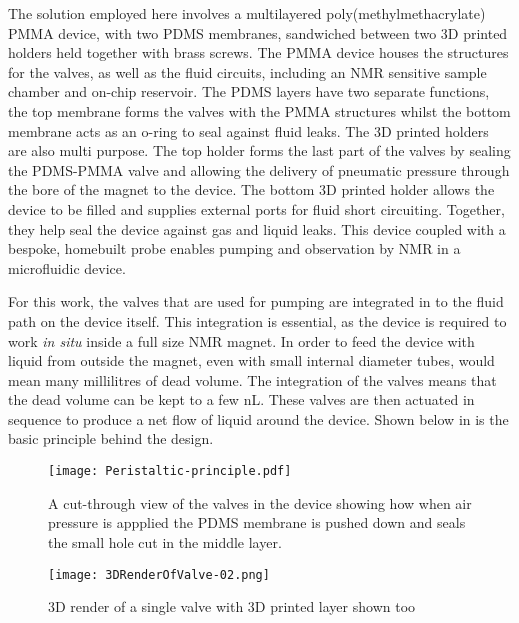The solution employed here involves a multilayered poly(methylmethacrylate) PMMA device,
with two PDMS membranes, sandwiched between two 3D printed holders held together with brass
screws. The PMMA device houses the structures for the valves, as well as the fluid circuits,
including an NMR sensitive sample chamber and on-chip reservoir. The PDMS layers have two
separate functions, the top membrane forms the valves with the PMMA structures whilst the
bottom membrane acts as an o-ring to seal against fluid leaks. The 3D printed holders
are also multi purpose. The top holder forms the last part of the valves by sealing the
PDMS-PMMA valve and allowing the delivery of pneumatic pressure through the bore of the
magnet to the device. The bottom 3D printed holder allows the device to be filled and
supplies external ports for fluid short circuiting. Together, they help seal the device
against gas and liquid leaks. This device coupled with a bespoke, homebuilt probe enables
pumping and observation by NMR in a microfluidic device.

For this work, the valves that are used for pumping are integrated
in to the fluid path on the device itself. This integration is essential, as the
device is required to work \textit{in situ} inside a full size NMR magnet. In order
to feed the device with liquid from outside the magnet, even with small internal diameter
tubes, would mean many millilitres of dead volume. The integration
of the valves means that the dead volume can be kept to a few nL. These valves are
then actuated in sequence to produce a net flow of liquid around the device.
Shown below in  is the
basic principle behind the design.

\begin{figure}[ht]
  \begin{center}
  \texttt{[image: Peristaltic-principle.pdf]}
  \caption{A cut-through view of the valves in the device showing how when air pressure is
  appplied the PDMS membrane is pushed down and seals the small hole cut in the middle layer.}
  \label{fig:PP-device}
  \end{center}
\end{figure}

\begin{figure}[ht]
  \begin{center}
  \texttt{[image: 3DRenderOfValve-02.png]}
  \caption{3D render of a single valve with 3D printed layer shown too}
  \label{fig:ValveRend}
  \end{center}
\end{figure}

